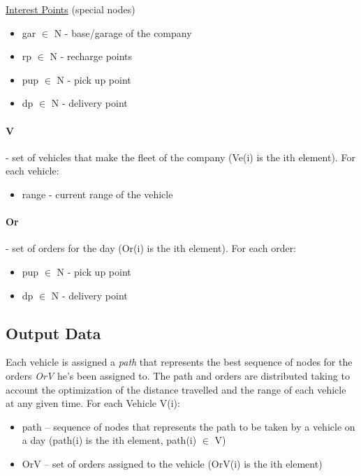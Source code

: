 \documentclass[12pt]{article}
\begin{document}
\uline{Interest Points} (special nodes)
\begin{itemize}
	\item gar $ \in $  N - base/garage of the company
	\item rp $ \in $  N - recharge points
	\item pup $ \in $  N - pick up point
	\item dp $ \in $  N - delivery point
\end{itemize}

\paragraph{V} - set of vehicles that make the fleet of the company (Ve(i) is the ith element). For each vehicle:
\begin{itemize}
	\item range - current range of the vehicle
\end{itemize}

\paragraph{Or} - set of orders for the day (Or(i) is the ith element). For each order:
\begin{itemize}
    \item pup $ \in $  N - pick up point
	\item dp $ \in $  N - delivery point
\end{itemize}


\subsection{Output Data}
Each vehicle is assigned a \textit{path} that represents the best sequence of nodes for the orders \textit{OrV} he's been assigned to. The path and orders are distributed taking to account the optimization of the distance travelled and the range of each vehicle at any given time.
For each Vehicle V(i):
\begin{itemize}
	\item path – sequence of nodes that represents the path to be taken by a vehicle on a day (path(i) is the ith element, path(i) $ \in $  V)
	\item OrV – set of orders assigned to the vehicle (OrV(i) is the ith element)
\end{itemize}
\end{document}
